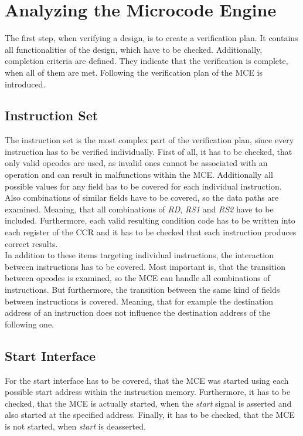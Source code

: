 \section{Analyzing the Microcode Engine}

The first step, when verifying a design, is to create a verification plan. 
It contains all functionalities of the design, which have to be checked.
Additionally, completion criteria are defined. They indicate that the verification is complete, when all of them are met.
Following the verification plan of the MCE is introduced.

\subsection{Instruction Set}

The instruction set is the most complex part of the verification plan, since every instruction has to be verified individually.
First of all, it has to be checked, that only valid opcodes are used, as invalid ones cannot be associated with an operation and can result in malfunctions
within the MCE. Additionally all possible values for any field has to be covered for each individual instruction.\\
Also combinations of similar fields have to be covered, so the data paths are examined.
Meaning, that all combinations of \emph{RD}, \emph{RS1} and \emph{RS2} have to be included.
Furthermore, each valid resulting condition code has to be written into each register of the CCR and it has to be checked that each instruction produces correct
results.\\
In addition to these items targeting individual instructions, the interaction between instructions has to be covered.
Most important is, that the transition between opcodes is examined, so the MCE can handle all combinations of instructions.
But furthermore, the transition between the same kind of fields between instructions is covered.
Meaning, that for example the destination address of an instruction does not influence the destination address of the following one.

\subsection{Start Interface}

For the start interface has to be covered, that the MCE was started using each possible start address within the instruction memory.
Furthermore, it has to be checked, that the MCE is actually started, when the \emph{start} signal is asserted and also started at the specified address.
Finally, it has to be checked, that the MCE is not started, when \emph{start} is deasserted.

